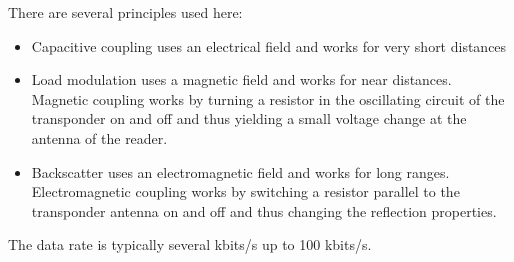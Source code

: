 \begin{mytitle} There are several principles used here:
\begin{itemize}
    \item Capacitive coupling uses an electrical field and works for very short distances
    \item Load modulation uses a magnetic field and works for near distances. Magnetic coupling works by turning a resistor in the oscillating circuit of the transponder on and off and thus yielding a small voltage change at the antenna of the reader.
    \item Backscatter uses an electromagnetic field and works for long ranges. Electromagnetic coupling works by switching a resistor parallel to the transponder antenna on and off and thus changing the reflection properties. 
\end{itemize}
The data rate is typically several kbits/s up to 100 kbits/s.
\end{mytitle}


